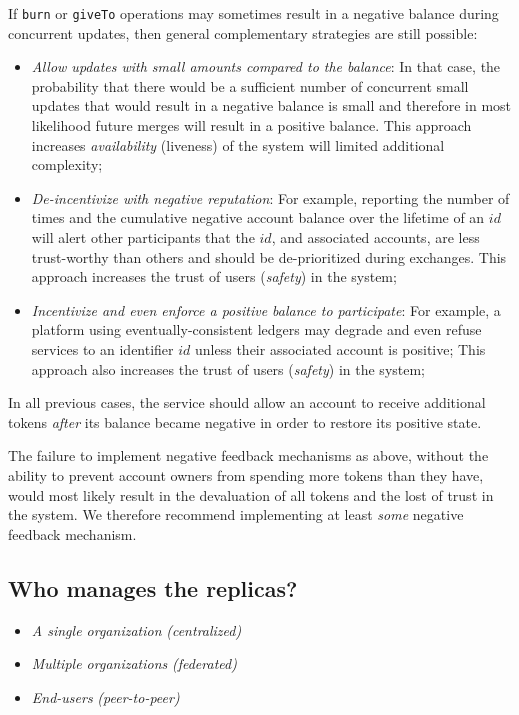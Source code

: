 \documentclass[9pt, oneside]{article}   	%
\begin{document}
If \texttt{burn} or \texttt{giveTo} operations may sometimes result in a negative balance during concurrent updates, then general complementary strategies are still possible:
\begin{itemize}
	\item \textit{Allow updates with small amounts compared to the balance}: In that case, the probability that there would be a sufficient number of concurrent small updates that would result in a negative balance is small and therefore in most likelihood future merges will result in a positive balance. This approach increases \textit{availability} (liveness) of the system will limited additional complexity;
	\item \textit{De-incentivize with negative reputation}: For example, reporting the number of times and the cumulative negative account balance over the lifetime of an $id$ will alert other participants that the $id$, and associated accounts, are less trust-worthy than others and should be de-prioritized during exchanges. This approach increases the trust of users (\textit{safety}) in the system;
	\item \textit{Incentivize and even enforce a positive balance to participate}: For example, a platform using eventually-consistent ledgers may degrade and even refuse services to an identifier $id$ unless their associated account is positive;  This approach also increases the trust of users (\textit{safety}) in the system;
\end{itemize}

In all previous cases, the service should allow an account to receive additional tokens \textit{after} its balance became negative in order to restore its positive state. 

The failure to implement negative feedback mechanisms as above, without the ability to prevent account owners from spending more tokens than they have, would most likely result in the devaluation of all tokens and the lost of trust in the system. We therefore recommend implementing at least \textit{some} negative feedback mechanism.

\subsection{Who manages the replicas?}

\begin{itemize}
	\item \textit{A single organization} \textit{(centralized)}
	\item \textit{Multiple organizations}  \textit{(federated)}
	\item \textit{End-users} \textit{(peer-to-peer)}
\end{itemize}
\end{document}
